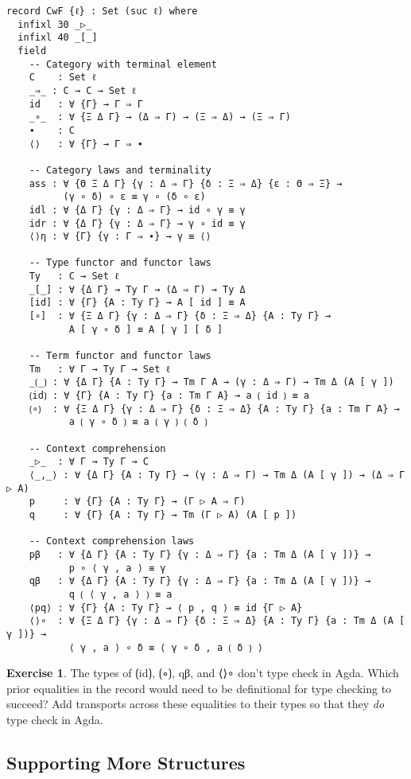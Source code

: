\documentclass{article}
\renewcommand{\_}{\textrm{\textscale{.5}{\textunderscore}}}
\theoremstyle{definition}
\newtheorem{exercise}[definition]{Exercise}
\theoremstyle{plain}
\begin{document}
\setmonofont{iosevka.ttc}
\begin{verbatim}
record CwF {ℓ} : Set (suc ℓ) where
  infixl 30 _▷_
  infixl 40 _[_]
  field
    -- Category with terminal element
    C    : Set ℓ
    _⇒_ : C → C → Set ℓ
    id   : ∀ {Γ} → Γ ⇒ Γ
    _∘_  : ∀ {Ξ Δ Γ} → (Δ ⇒ Γ) → (Ξ ⇒ Δ) → (Ξ ⇒ Γ)
    ∙    : C
    ⟨⟩   : ∀ {Γ} → Γ ⇒ ∙

    -- Category laws and terminality
    ass : ∀ {Θ Ξ Δ Γ} {γ : Δ ⇒ Γ} {δ : Ξ ⇒ Δ} {ε : Θ ⇒ Ξ} →
          (γ ∘ δ) ∘ ε ≡ γ ∘ (δ ∘ ε)
    idl : ∀ {Δ Γ} {γ : Δ ⇒ Γ} → id ∘ γ ≡ γ
    idr : ∀ {Δ Γ} {γ : Δ ⇒ Γ} → γ ∘ id ≡ γ
    ⟨⟩η : ∀ {Γ} {γ : Γ ⇒ ∙} → γ ≡ ⟨⟩

    -- Type functor and functor laws
    Ty   : C → Set ℓ
    _[_] : ∀ {Δ Γ} → Ty Γ → (Δ ⇒ Γ) → Ty Δ
    [id] : ∀ {Γ} {A : Ty Γ} → A [ id ] ≡ A
    [∘]  : ∀ {Ξ Δ Γ} {γ : Δ ⇒ Γ} {δ : Ξ ⇒ Δ} {A : Ty Γ} →
           A [ γ ∘ δ ] ≡ A [ γ ] [ δ ]

    -- Term functor and functor laws
    Tm   : ∀ Γ → Ty Γ → Set ℓ
    _⟮_⟯ : ∀ {Δ Γ} {A : Ty Γ} → Tm Γ A → (γ : Δ ⇒ Γ) → Tm Δ (A [ γ ])
    ⟮id⟯ : ∀ {Γ} {A : Ty Γ} {a : Tm Γ A} → a ⟮ id ⟯ ≡ a
    ⟮∘⟯  : ∀ {Ξ Δ Γ} {γ : Δ ⇒ Γ} {δ : Ξ ⇒ Δ} {A : Ty Γ} {a : Tm Γ A} →
           a ⟮ γ ∘ δ ⟯ ≡ a ⟮ γ ⟯ ⟮ δ ⟯

    -- Context comprehension
    _▷_  : ∀ Γ → Ty Γ → C
    ⟨_,_⟩ : ∀ {Δ Γ} {A : Ty Γ} → (γ : Δ ⇒ Γ) → Tm Δ (A [ γ ]) → (Δ ⇒ Γ ▷ A)
    p     : ∀ {Γ} {A : Ty Γ} → (Γ ▷ A ⇒ Γ)
    q     : ∀ {Γ} {A : Ty Γ} → Tm (Γ ▷ A) (A [ p ])

    -- Context comprehension laws
    pβ   : ∀ {Δ Γ} {A : Ty Γ} {γ : Δ ⇒ Γ} {a : Tm Δ (A [ γ ])} →
           p ∘ ⟨ γ , a ⟩ ≡ γ
    qβ   : ∀ {Δ Γ} {A : Ty Γ} {γ : Δ ⇒ Γ} {a : Tm Δ (A [ γ ])} →
           q ⟮ ⟨ γ , a ⟩ ⟯ ≡ a
    ⟨pq⟩ : ∀ {Γ} {A : Ty Γ} → ⟨ p , q ⟩ ≡ id {Γ ▷ A}
    ⟨⟩∘  : ∀ {Ξ Δ Γ} {γ : Δ ⇒ Γ} {δ : Ξ ⇒ Δ} {A : Ty Γ} {a : Tm Δ (A [ γ ])} →
           ⟨ γ , a ⟩ ∘ δ ≡ ⟨ γ ∘ δ , a ⟮ δ ⟯ ⟩
\end{verbatim}

\begin{exercise}
The types of {\codefont ⟮id⟯}, {\codefont ⟮∘⟯}, {\codefont qβ}, and {\codefont ⟨⟩∘}
don't type check in Agda.
Which prior equalities in the record would need to be definitional for type checking to succeed?
Add transports across these equalities to their types so that they \emph{do} type check in Agda.
\end{exercise}

\subsection{Supporting More Structures}
\end{document}
